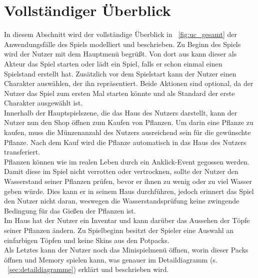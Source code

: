 \section{Vollständiger Überblick}\label{sec:vollstandiger-uberblick}
In diesem Abschnitt wird der vollständige Überblick in ~\autoref{fig:uc_gesamt} der Anwendungsfälle des Spiels 
modelliert und beschrieben.
Zu Beginn des Spiels wird der Nutzer mit dem Hauptmenü begrüßt.
Von dort aus kann dieser als Akteur das Spiel starten oder lädt ein Spiel, falls er schon einmal einen Spielstand 
erstellt hat.
Zusätzlich vor dem Spielstart kann der Nutzer einen Charakter auswählen, der ihn repräsentiert. 
Beide Aktionen sind optional, da der Nutzer das Spiel zum ersten Mal starten könnte und als Standard der erste 
Charakter ausgewählt ist.\\
Innerhalb der Hauptspielszene, die das Haus des Nutzers darstellt, kann der Nutzer nun den Shop öffnen zum Kaufen 
von Pflanzen. 
Um darin eine Pflanze zu kaufen, muss die Münzenanzahl des Nutzers ausreichend sein für die gewünschte Pflanze.
Nach dem Kauf wird die Pflanze automatisch in das Haus des Nutzers transferiert.\\
Pflanzen können wie im realen Leben durch ein Anklick-Event gegossen werden.
Damit diese im Spiel nicht verrotten oder vertrocknen, sollte der Nutzer den Wasserstand seiner Pflanzen prüfen, 
bevor er ihnen zu wenig oder zu viel Wasser geben würde. 
Dies kann er in seinem Haus durchführen, jedoch erinnert das Spiel den Nutzer nicht daran, 
weswegen die Wasserstandsprüfung keine zwingende Bedingung für das Gießen der Pflanzen ist.\\
Im Haus hat der Nutzer ein Inventar und kann darüber das Aussehen der Töpfe seiner Pflanzen ändern. 
Zu Spielbeginn besitzt der Spieler eine Auswahl an einfarbigen Töpfen und keine Skins aus den Potpacks. \\ 
Als Letztes kann der Nutzer noch das Minispielmenü öffnen, worin dieser Packs öffnen und Memory spielen kann,
was genauer im Detaildiagramm (s. ~\autoref{sec:detaildiagramme}) erklärt und beschrieben wird.


